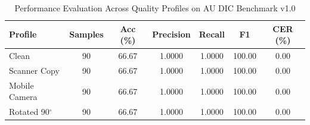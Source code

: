 \begin{table}[htbp]
\caption{Performance Evaluation Across Quality Profiles on AU DIC Benchmark v1.0}
\label{tab:profile_degradation}
\centering
\begin{tabular}{lcccccc}
\hline
\textbf{Profile} & \textbf{Samples} & \textbf{Acc (\%)} & \textbf{Precision} & \textbf{Recall} & \textbf{F1} & \textbf{CER (\%)} \\
\hline
Clean & 90 & 66.67 & 1.0000 & 1.0000 & 100.00 & 0.00 \\
Scanner Copy & 90 & 66.67 & 1.0000 & 1.0000 & 100.00 & 0.00 \\
Mobile Camera & 90 & 66.67 & 1.0000 & 1.0000 & 100.00 & 0.00 \\
Rotated 90$^\circ$ & 90 & 66.67 & 1.0000 & 1.0000 & 100.00 & 0.00 \\
\hline
\end{tabular}
\end{table}